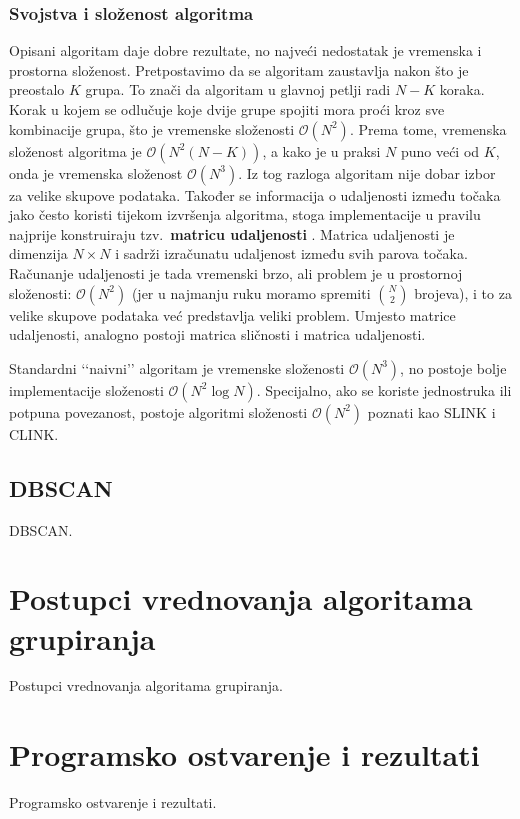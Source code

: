 \documentclass[times, utf8, zavrsni]{fer}
\begin{document}
\subsection{Svojstva i složenost algoritma}
Opisani algoritam daje dobre rezultate, no najveći nedostatak je vremenska i prostorna složenost. Pretpostavimo da se algoritam zaustavlja nakon što je preostalo $K$ grupa. To znači da algoritam u glavnoj petlji radi $N-K$ koraka. Korak u kojem se odlučuje koje dvije grupe spojiti mora proći kroz sve kombinacije grupa, što je vremenske složenosti $\mathcal{O} \left(N^2\right)$. Prema tome, vremenska složenost algoritma je $\mathcal{O} \left(N^2 \left(N-K\right)\right)$, a kako je u praksi $N$ puno veći od $K$, onda je vremenska složenost $\mathcal{O} \left(N^3\right)$. Iz tog razloga algoritam nije dobar izbor za velike skupove podataka. Također se informacija o udaljenosti između točaka jako često koristi tijekom izvršenja algoritma, stoga implementacije u pravilu najprije konstruiraju tzv.\ \textbf{matricu udaljenosti} . Matrica udaljenosti je dimenzija $N \times N$ i sadrži izračunatu udaljenost između svih parova točaka. Računanje udaljenosti je tada vremenski brzo, ali problem je u prostornoj složenosti: $\mathcal{O} \left(N^2\right)$ (jer u najmanju ruku moramo spremiti ${N}\choose2$ brojeva), i to za velike skupove podataka već predstavlja veliki problem. Umjesto matrice udaljenosti, analogno postoji matrica sličnosti i matrica udaljenosti.

Standardni ‘‘naivni’’ algoritam je vremenske složenosti $\mathcal{O} \left(N^3\right)$, no postoje bolje implementacije složenosti $\mathcal{O} \left(N^2 \log N\right)$. Specijalno, ako se koriste jednostruka ili potpuna povezanost, postoje algoritmi složenosti $\mathcal{O} \left(N^2\right)$ poznati kao SLINK i CLINK.

\section{DBSCAN}
DBSCAN.

\chapter{Postupci vrednovanja algoritama grupiranja}
Postupci vrednovanja algoritama grupiranja.

\chapter{Programsko ostvarenje i rezultati}
Programsko ostvarenje i rezultati.
\end{document}
